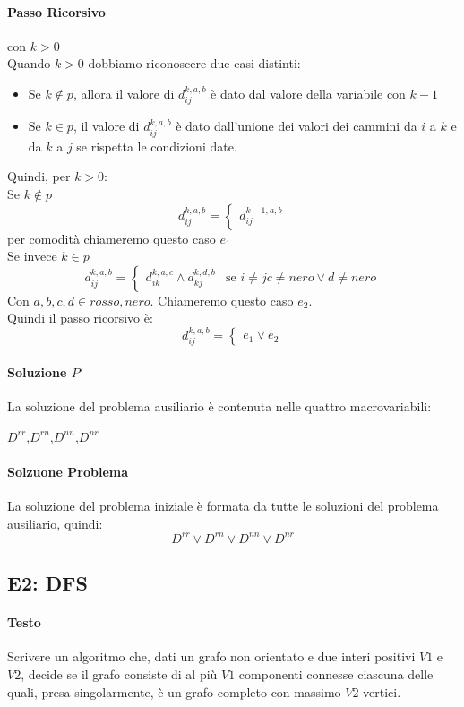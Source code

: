 \documentclass[12pt, a4paper, openany]{book}
\begin{document}
\paragraph*{Passo Ricorsivo} con $k>0$\\
Quando $k>0$ dobbiamo riconoscere due casi distinti:
\begin{itemize}
	\item Se $k\notin p$, allora il valore di $d_{ij}^{k,a,b}$ è dato dal valore della variabile con $k-1$
	\item Se $k \in p$, il valore di $d_{ij}^{k,a,b}$ è dato dall'unione dei valori dei cammini da $i$ a $k$ e da $k$ a $j$ se rispetta le condizioni date.
\end{itemize}
Quindi, per $k>0$:
\\Se $k \notin p$
$$d_{ij}^{k,a,b} = \begin{cases}
	d_{ij}^{k-1,a,b}
\end{cases}
$$
per comodità chiameremo questo caso $e_1$
\\Se invece $k\in p$
$$d_{ij}^{k,a,b} = \begin{cases}
	d_{ik}^{k,a,c} \wedge d_{kj}^{k,d,b} & \text{se } i\neq j c\neq nero \vee d \neq nero
\end{cases}
$$
Con $a,b,c,d \in {rosso,nero}$. Chiameremo questo caso $e_2$.
\\Quindi il passo ricorsivo è:
$$
	d_{ij}^{k,a,b} = \begin{cases}
		e_1 \vee e_2
	\end{cases} 
$$

\paragraph*{Soluzione $P'$}
La soluzione del problema ausiliario è contenuta nelle quattro macrovariabili:
\begin{center}
	$D^{rr}$,$D^{rn}$,$D^{nn}$,$D^{nr}$
\end{center}
\paragraph*{Solzuone Problema}
La soluzione del problema iniziale è formata da tutte le soluzioni del problema ausiliario, quindi:
$$
D^{rr}\vee D^{rn}\vee D^{nn}\vee D^{nr}
$$

\subsection{E2: DFS}
\paragraph*{Testo}
Scrivere un algoritmo che, dati un grafo non orientato e due interi positivi $V1$ e $V2$, 
decide se il grafo consiste di al più $V1$ componenti connesse ciascuna delle quali, presa singolarmente, è un grafo completo con massimo $V2$ vertici. 
\end{document}
